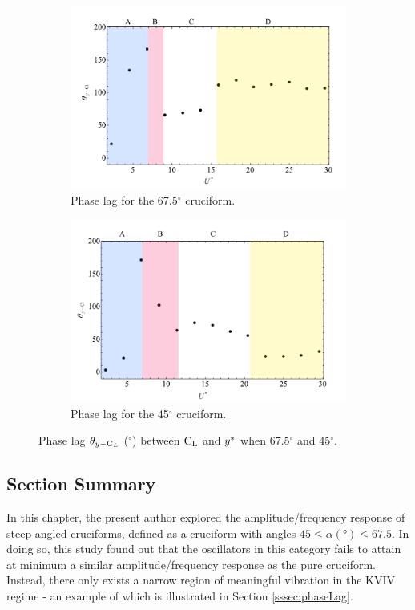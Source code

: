 \documentclass[oneside]{utmthesis}
\begin{document}
\begin{figure}
  \centering
  \begin{subfigure}[h]{1\textwidth}
    \includegraphics[width=\textwidth]{figs/phaseLag4}
    \caption{Phase lag for the 67.5$^{\circ}$ cruciform.}
    \label{fig:phaseLag675deg}
  \end{subfigure}
  
  \begin{subfigure}[h]{1\textwidth}
    \includegraphics[width=\textwidth]{figs/phaseLag3}
    \caption{Phase lag for the 45$^{\circ}$ cruciform.}
    \label{fig:phaseLag45deg}
  \end{subfigure}

  \caption{Phase lag $\theta_{y-\text{C}_{L}}$ ($^{\circ}$) between $\text{C}_{\text{L}}$ and $y^{*}$ when 67.5$^{\circ}$ and 45$^{\circ}$.}
  \label{fig:phaseLag67545deg}
\end{figure}

\subsection{Section Summary} \label{ssec:secSumSteep}
In this chapter, the present author explored the amplitude/frequency response of steep-angled cruciforms, defined as a cruciform with angles $45 \leq \alpha (\si{\degree}) \leq 67.5$. In doing so, this study found out that the oscillators in this category fails to attain at minimum a similar amplitude/frequency response as the pure cruciform. Instead, there only exists a narrow region of meaningful vibration in the KVIV regime - an example of which is illustrated in Section \ref{sssec:phaseLag}.
\end{document}
